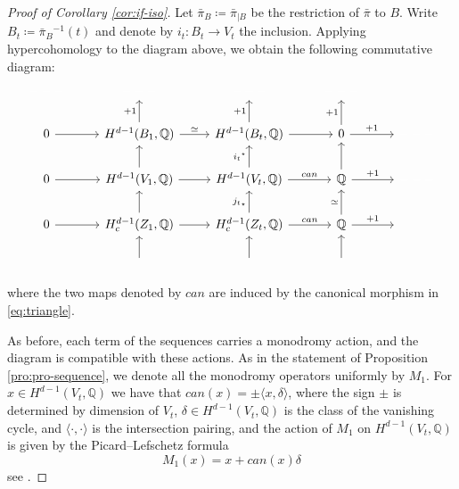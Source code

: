 \documentclass[11pt, reqno]{amsart}
\theoremstyle{plain}
\theoremstyle{definition}
\newcommand{\QQ}{\mathbb{Q}}
\begin{document}
\begin{proof}[Proof of Corollary \ref{cor:if-iso}]
Let $\bar{\pi}_B\coloneqq \bar{\pi}_{|B}$ be the restriction of $\bar{\pi}$ to $B$. Write $B_t \coloneqq {\bar{\pi}_B}^{-1}(t)$ and denote by $i_t \colon B_t \to V_t$ the inclusion. 
Applying hypercohomology to the diagram above, we obtain the following commutative diagram:
\begin{equation}
\label{eq:diagram-Bt-Zt}
\begin{tikzcd}
\textcolor{white}{---} & \textcolor{white}{---} & \textcolor{white}{---} & \textcolor{white}{---}\\
0 \rar & H^{d-1}(B_1, \QQ) \rar{\simeq}  \uar{+1}  &    H^{d-1}(B_t,\QQ)  \rar{} \uar{+1} & 0 \rar{+1}  \uar{+1} & \textcolor{white}{---}\\
0 \rar & H^{d-1}(V_1, \QQ) \rar{}  \uar{} &    H^{d-1}(V_t, \QQ)  \rar{can} \uar{{i_{t}}^{\star}} & \QQ \rar{+1} \uar{} & \textcolor{white}{---} \\
0 \rar & H_c^{d-1}(Z_1, \QQ) \rar{}   \uar{} &    H_c^{d-1}(Z_t, \QQ)  \rar{can} \uar{{j_t}_\star} & \QQ \rar{+1} \uar{\simeq} & \textcolor{white}{---} \\
\textcolor{white}{---}   & \textcolor{white}{---} \uar{} & \textcolor{white}{---} \uar{} &  \textcolor{white}{---} \uar{} & \textcolor{white}{---} 
\end{tikzcd}
\end{equation}
where the two maps denoted by $can$ are induced by the canonical morphism in \eqref{eq:triangle}. 

As before, each term of the sequences carries a monodromy action, and the diagram is compatible with these actions. 
As in the statement of Proposition \ref{pro:pro-sequence}, 
we denote all the monodromy operators uniformly by $M_1$. 
For $x \in H^{d-1}(V_t, \QQ)$ we have that $can(x)=\pm \langle x, \delta \rangle$,  where the sign $\pm$ is determined by dimension of $V_t$,  $\delta \in H^{d-1}(V_t, \QQ)$ is the class of the vanishing cycle, and $\langle \cdot, \cdot \rangle$ is the intersection pairing, 
and the action of $M_1$ on $H^{d-1}(V_t, \QQ)$ is given by the Picard--Lefschetz formula
\begin{equation} 
\label{eq:PL} M_1(x) = x +can(x) \delta 
\end{equation} see \cite[Section 3.3]{Dimca92}.


\end{proof}
\end{document}
